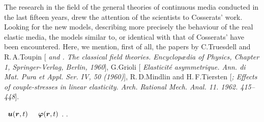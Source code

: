 \begin{tcolorbox}[breakable, enhanced, colback = orange!8, before upper={\parindent3.2ex}, parbox = false]
The research in the field of the general theories of continuous media conducted in the last fifteen years, drew the attention of the scientists to Cosserats’ work. Looking for the new models, describing more precisely the behaviour of the real elastic media, the models similar to, or identical with that of Cosserats’ have been encountered. Here, we mention, first of all, the papers by C.\:Truesdell and R.\,A.\;Toupin [\textit{ and . The classical field theories. Encyclopædia of Physics, Chapter 1, Springer\hbox{-}Verlag, Berlin, 1960}], G.\:Grioli [\textit{ Elasticité asymmetrique. Ann. di Mat. Pura et Appl. Ser. IV, 50 (1960)}], R.\,D.\;Mindlin and H.\,F.\;Tiersten [\textit{;  Effects of couple-stresses in linear elasticity. Arch. Rational Mech. Anal. 11. 1962. 415\hbox{--}448}].
\par
\end{tcolorbox}

\vspace{2mm}

 ~${\bm{u}(\bm{r},t)}$ ~~${\bm{\varphi}(\bm{r},t)}$ .
.


